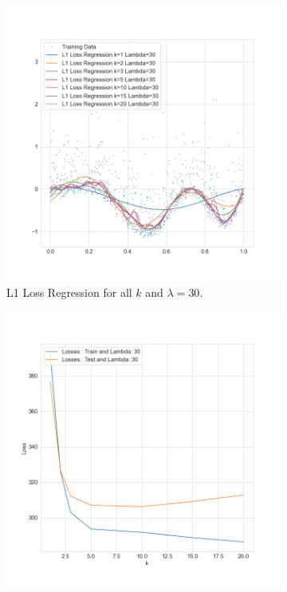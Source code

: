 \documentclass{./tufte-handout}
\begin{document}
\begin{enumerate}[(a)]
\begin{enumerate}
   \begin{figure}
    \centering
    \begin{subfigure}[b]{.5\textwidth}
        \includegraphics{../figures/l1_regression_all_k_lambda_30.png}
        \caption{L1 Loss Regression for all $k$ and $\lambda=30$.}
    \end{subfigure}%
    \begin{subfigure}[b]{.5\textwidth}
        \includegraphics{../figures/l1_losses_for_k_lambda_30.png}

\end{subfigure}
\end{figure}
\end{enumerate}
\end{enumerate}
\end{document}
